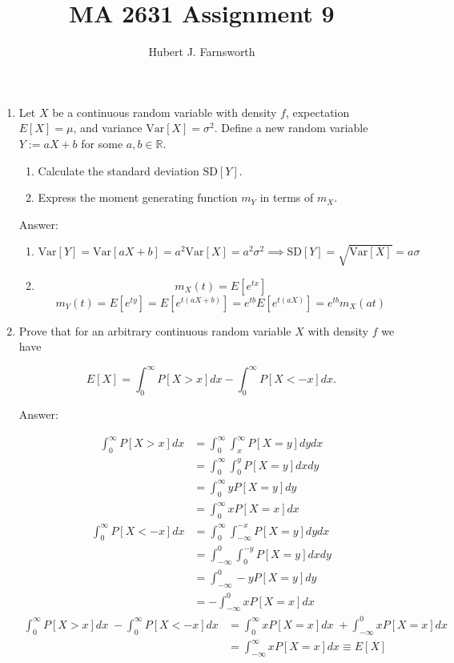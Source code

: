 \documentclass{article}
\title{MA 2631 Assignment 9}
\author{Hubert J. Farnsworth}
\begin{document}
\maketitle

\begin{enumerate}

\item

Let $X$ be a continuous random variable with density $f$, expectation $E[X] = \mu$, and variance $\text{Var}[X] = \sigma^2$. Define a new random variable $Y:= aX+b$ for some $a,b \in \mathbb{R}$. 

\begin{enumerate}
\item Calculate the standard deviation $\text{SD}[Y]$. 

\item Express the moment generating function $m_Y$ in terms of $m_X$. 
\end{enumerate}

Answer:

\begin{enumerate}
\item
$$
\text{Var}[Y] = \text{Var}[aX + b] = a^2 \text{Var}[X] = a^2\sigma^2 \implies \text{SD}[Y] = \sqrt{\text{Var}[X]} = \boxed{a\sigma}
$$

\item
$$
m_X(t) = E[e^{tx}]
$$
$$
m_Y(t) = E[e^{ty}] = E[e^{t(aX+b)}]
= e^{tb}E[e^{t(aX)}] = \boxed{e^{tb}m_X(at)}
$$
\end{enumerate}

\newpage
\item

Prove that for an arbitrary continuous random variable $X$ with density $f$ we have 

$$
E[X] = \int_0^\infty P[X > x] dx - \int_0^\infty P[X < -x] dx .
$$

Answer: 

\begin{align*}
\int_0^\infty P[X > x] dx &= \int_0^\infty \int_x^\infty P[X = y] dy dx \\
&= \int_0^\infty \int_0^y P[X = y] dx dy \\
&= \int_0^\infty y P[X = y] dy \\
&= \int_0^\infty xP[X = x] dx
\end{align*}
\begin{align*}
\int_0^\infty P[X < -x] dx &= \int_0^\infty \int_{-\infty}^{-x} P[X = y] dy dx \\
&= \int_{-\infty}^0 \int_0^{-y} P[X = y] dx dy \\
&= \int_{-\infty}^0 -y P[X = y] dy \\
&= -\int_{-\infty}^0 xP[X = x] dx
\end{align*}
\begin{align*}
\int_0^\infty P[X > x] dx \;- \int_0^\infty P[X < -x] dx &= 
\int_0^\infty xP[X = x] dx \;+ \int_{-\infty}^0 x P[X = x] dx \\
&=
\int_{-\infty}^\infty xP[X = x] dx 
\equiv E[X]
\end{align*}



\end{enumerate}
\end{document}
